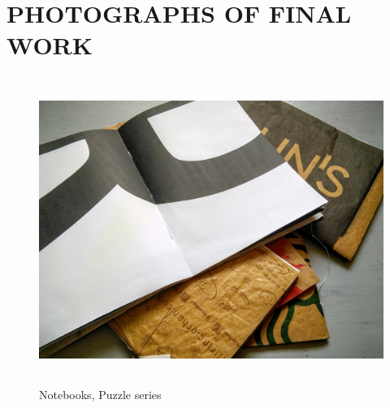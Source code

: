 \chapter{PHOTOGRAPHS OF FINAL WORK}

\begin{figure}[h!]
  \centering
  \includegraphics[height=10cm]{project_graphics/notebooks_puzzle_open.jpg}
  \caption{Notebooks, Puzzle series}
  \label{fig:NorebooksPuzzle}
\end{figure}



